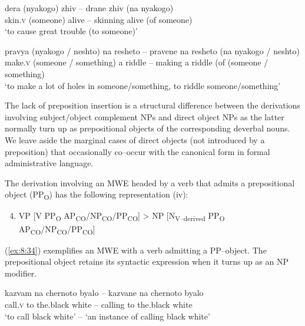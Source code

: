 \documentclass[output=paper]{langsci/langscibook}
\begin{document}
\begin{exe}
\ex \label{ex:8:32}
\settowidth{}
\gll dera (nyakogo) zhiv – drane zhiv (na nyakogo)\\ 
 skin.\textsc{v} (someone) alive – skinning alive (of someone) \\ 
 \glt ‘to cause great trouble (to someone)’
\end{exe}


\begin{exe}
\ex \label{ex:8:33}
\settowidth{}
\gll pravya (nyakogo / neshto) na resheto – pravene na resheto (na
nyakogo / neshto)  \\
make.\textsc{v} (someone / something)  a riddle – making  a riddle (of (someone / something) \\  
\glt `to make a lot of holes in someone/something, to riddle someone/something’
\end{exe}


The lack of preposition insertion is a structural difference between the
derivations involving subject/object complement NPs and direct object
NPs as the latter normally turn up as prepositional objects of the
corresponding deverbal nouns. We leave aside the marginal cases of
direct objects (not introduced by a preposition) that occasionally
co–occur with the canonical form in formal administrative language. 



The derivation involving an MWE headed by a verb that admits a
prepositional object (PP\textsubscript{O}) has the following
representation (iv):

\renewcommand{\theenumi}{(\roman{enumi})}%
\begin{enumerate}
 \setcounter{enumi}{3}
 \item VP [V PP\textsubscript{O}
AP\textsubscript{CO}/NP\textsubscript{CO}/PP\textsubscript{CO}] > NP
[N\textsubscript{V–derived} PP\textsubscript{O}
AP\textsubscript{CO}/NP\textsubscript{CO}/PP\textsubscript{CO}]
\end{enumerate}

(\ref{ex:8:34}) exemplifies an MWE with a verb admitting a PP–object. The
prepositional object retains its syntactic expression when it turns up
as an NP modifier.


\begin{exe}
\ex \label{ex:8:34}
\settowidth{}
\gll  kazvam na chernoto byalo – kazvane na chernoto byalo\\ 
call.\textsc{v} to the.black white – calling to the.black white \\ 
\glt ‘to call black white’ – ‘an instance of calling black white’ 
\end{exe}
\end{document}
